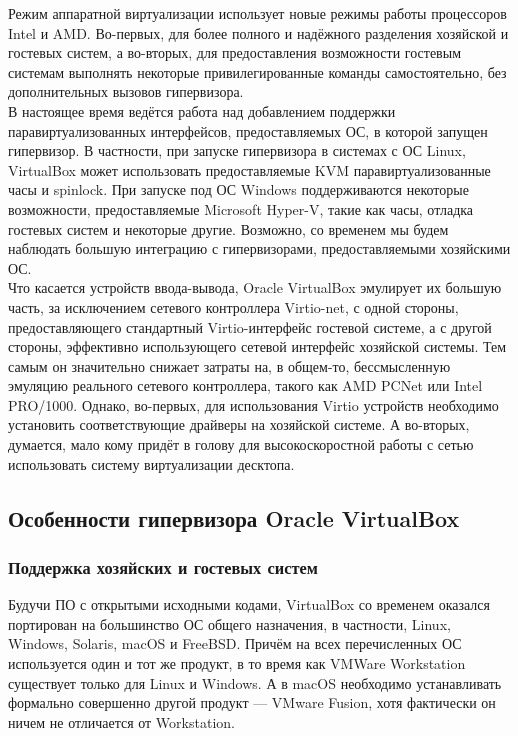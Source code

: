 \documentclass[14pt, a4paper]{article}
\begin{document}
Режим аппаратной виртуализации использует новые режимы работы процессоров Intel и AMD.
Во-первых, для более полного и надёжного разделения хозяйской и гостевых систем, а во-вторых, для 
предоставления возможности гостевым системам выполнять некоторые привилегированные команды
самостоятельно, без дополнительных вызовов гипервизора.\\

В настоящее время ведётся работа над добавлением поддержки паравиртуализованных
интерфейсов, предоставляемых ОС, в которой запущен гипервизор. В частности, при запуске
гипервизора в системах с ОС Linux, VirtualBox может использовать предоставляемые KVM
паравиртуализованные часы и spinlock. При запуске под ОС Windows поддерживаются некоторые
возможности, предоставляемые Microsoft Hyper-V, такие как часы, отладка гостевых систем и
некоторые другие. Возможно, со временем мы будем наблюдать большую интеграцию с
гипервизорами, предоставляемыми хозяйскими ОС.\\

Что касается устройств ввода-вывода, Oracle VirtualBox эмулирует их большую часть, за исключением
сетевого контроллера Virtio-net, с одной стороны, предоставляющего стандартный Virtio-интерфейс
гостевой системе, а с другой стороны, эффективно использующего сетевой интерфейс хозяйской
системы. Тем самым он значительно снижает затраты на, в общем-то, бессмысленную эмуляцию
реального сетевого контроллера, такого как AMD PCNet или Intel PRO/1000. Однако, во-первых, для
использования Virtio устройств необходимо установить соответствующие драйверы на хозяйской
системе. А во-вторых, думается, мало кому придёт в голову для высокоскоростной работы с сетью
использовать систему виртуализации десктопа.

\subsection*{Особенности гипервизора Oracle VirtualBox} 

\subsubsection*{Поддержка хозяйских и гостевых систем} 

Будучи ПО с открытыми исходными кодами, VirtualBox со временем оказался портирован на
большинство ОС общего назначения, в частности, Linux, Windows, Solaris, macOS и FreeBSD. Причём
на всех перечисленных ОС используется один и тот же продукт, в то время как VMWare Workstation
существует только для Linux и Windows. А в macOS необходимо устанавливать формально
совершенно другой продукт — VMware Fusion, хотя фактически он ничем не отличается от
Workstation.\\
\end{document}
